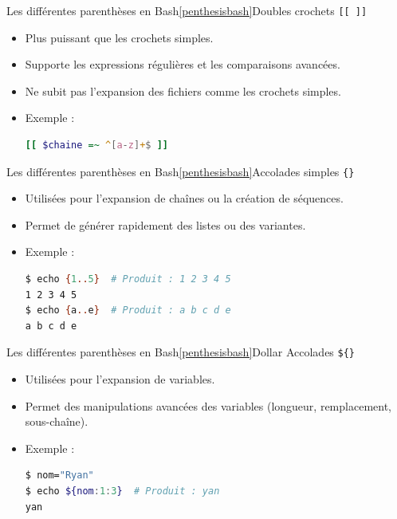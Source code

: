 \documentclass{beamer}
\begin{document}
    \begin{frame}[fragile]{Les différentes parenthèses en Bash\cref{penthesisbash}}{Doubles crochets \texttt{[[ ]]}}
        \begin{itemize}
            \item Plus puissant que les crochets simples.
            \item Supporte les expressions régulières et les comparaisons avancées.
            \item Ne subit pas l'expansion des fichiers comme les crochets simples.
            \item Exemple :
            \begin{lstlisting}[language=bash]
[[ $chaine =~ ^[a-z]+$ ]]
            \end{lstlisting}
        \end{itemize}
    \end{frame}

    \begin{frame}[fragile]{Les différentes parenthèses en Bash\cref{penthesisbash}}{Accolades simples \texttt{\{\}}}
        \begin{itemize}
            \item Utilisées pour l'expansion de chaînes ou la création de séquences.
            \item Permet de générer rapidement des listes ou des variantes.
            \item Exemple :
            \begin{lstlisting}[language=bash]
$ echo {1..5}  # Produit : 1 2 3 4 5
1 2 3 4 5
$ echo {a..e}  # Produit : a b c d e
a b c d e
            \end{lstlisting}
        \end{itemize}
    \end{frame}

    \begin{frame}[fragile]{Les différentes parenthèses en Bash\cref{penthesisbash}}{Dollar Accolades \texttt{\$\{\}}}
        \begin{itemize}
            \item Utilisées pour l'expansion de variables.
            \item Permet des manipulations avancées des variables (longueur, remplacement, sous-chaîne).
            \item Exemple :
            \begin{lstlisting}[language=bash]
$ nom="Ryan"
$ echo ${nom:1:3}  # Produit : yan
yan
            \end{lstlisting}
        \end{itemize}
    \end{frame}
\end{document}
